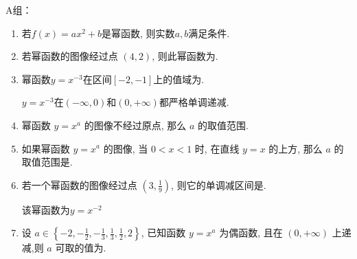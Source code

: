 A组：
\begin{enumerate}
\item 若$f(x)=ax^2+b$是幂函数, 则实数$a,b$满足条件. 

\item 若幂函数的图像经过点 $(4,2)$, 则此幂函数为.

\item 幂函数$y=x^{-3}$在区间$[-2,-1]$上的值域为\blkda{$[-1,-\frac{1}{8}]$}. 
\begin{jieda}
$y=x^{-3}$在$(-\infty,0)$和$(0,+\infty)$都严格单调递减. 
\end{jieda}

\item 幂函数 $y=x^a$ 的图像不经过原点, 那么 $a$ 的取值范围.

\item 如果幂函数 $y=x^a$ 的图像, 当 $0<x<1$ 时, 在直线 $y=x$ 的上方, 那么 $a$ 的取值范围是.

\item 若一个幂函数的图像经过点 $\left(3, \frac{1}{9}\right)$, 则它的单调减区间是.
\begin{jieda}
    该幂函数为$y = x^{-2}$
\end{jieda}

\item 设 $a \in\left\{-2,-\frac{1}{2},-\frac{1}{3}, \frac{1}{3}, \frac{1}{2}, 2\right\}$, 已知函数 $y=x^a$ 为偶函数, 且在 $(0,+\infty)$ 上递减,则 $a$ 可取的值为.

\end{enumerate}

